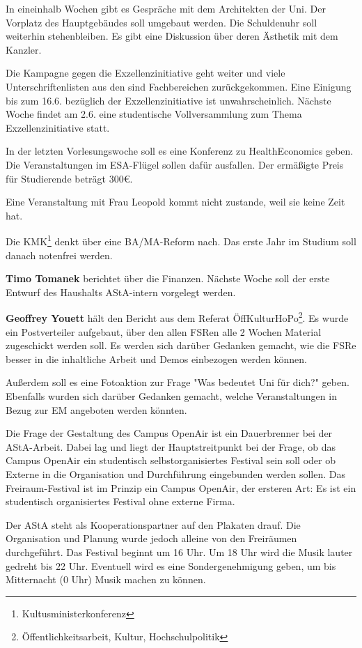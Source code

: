\documentclass[ngerman,headheight=70pt]{scrartcl}
\begin{document}
    In eineinhalb Wochen gibt es Gespräche mit dem Architekten der Uni.
    Der Vorplatz des Hauptgebäudes soll umgebaut werden. Die Schuldenuhr soll
    weiterhin stehenbleiben. Es gibt eine Diskussion über deren Ästhetik mit dem
    Kanzler.

    Die Kampagne gegen die Exzellenzinitiative geht weiter und viele
    Unterschriftenlisten aus den sind Fachbereichen zurückgekommen. Eine Einigung
    bis zum 16.6. bezüglich der Exzellenzinitiative ist unwahrscheinlich. Nächste
    Woche findet am 2.6. eine studentische Vollversammlung zum Thema Exzellenzinitiative
    statt.

    In der letzten Vorlesungswoche soll es eine Konferenz zu HealthEconomics geben.
    Die Veranstaltungen im ESA-Flügel sollen dafür ausfallen. Der ermäßigte Preis
    für Studierende beträgt 300€.

    Eine Veranstaltung mit Frau Leopold kommt nicht zustande, weil sie
    keine Zeit hat.

    Die KMK\footnote{Kultusministerkonferenz} denkt über eine BA/MA-Reform nach.
    Das erste Jahr im Studium soll danach notenfrei werden.

    \textbf{Timo Tomanek} berichtet über die Finanzen. Nächste Woche soll der
    erste Entwurf des Haushalts AStA-intern vorgelegt werden.

    \textbf{Geoffrey Youett} hält den Bericht aus dem Referat
    ÖffKulturHoPo\footnote{Öffentlichkeitsarbeit, Kultur, Hochschulpolitik}. Es
    wurde ein Postverteiler aufgebaut, über den allen FSRen alle 2 Wochen Material
    zugeschickt werden soll. Es werden sich darüber Gedanken gemacht, wie die FSRe
    besser in die inhaltliche Arbeit und Demos einbezogen werden können.

    Außerdem soll es eine Fotoaktion zur Frage "Was bedeutet Uni für dich?" geben.
    Ebenfalls wurden sich darüber Gedanken gemacht, welche Veranstaltungen in Bezug
    zur EM angeboten werden könnten.

    Die Frage der Gestaltung des Campus OpenAir ist ein Dauerbrenner bei der
    AStA-Arbeit. Dabei lag und liegt der Hauptstreitpunkt bei der Frage, ob das
    Campus OpenAir ein studentisch selbstorganisiertes Festival sein soll oder ob
    Externe in die Organisation und Durchführung eingebunden werden sollen.
    Das Freiraum-Festival ist im Prinzip ein Campus OpenAir, der ersteren Art:
    Es ist ein studentisch organisiertes Festival ohne externe Firma.

    Der AStA steht als Kooperationspartner auf den Plakaten drauf. Die Organisation
    und Planung wurde jedoch alleine von den Freiräumen durchgeführt. Das Festival
    beginnt um 16 Uhr. Um 18 Uhr wird die Musik lauter gedreht bis 22 Uhr. Eventuell
    wird es eine Sondergenehmigung geben, um bis Mitternacht (0 Uhr) Musik machen
    zu können.
\end{document}
